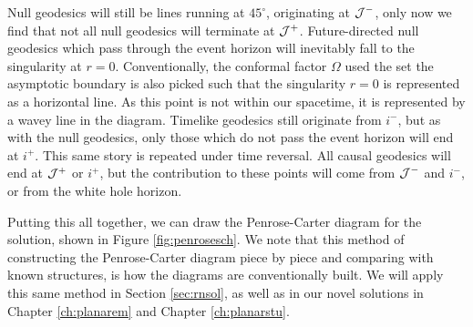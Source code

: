 Null geodesics will still be lines running at $45^\circ$, originating at ${\cal J}^-$, only now we find that not all null geodesics will terminate at ${\cal J}^+$. Future-directed null geodesics which pass through the event horizon will inevitably fall to the singularity at $r = 0$. Conventionally, the conformal factor $\Omega$ used the set the asymptotic boundary is also picked such that the singularity $r = 0$ is represented as a horizontal line. As this point is not within our spacetime, it is represented by a wavey line in the diagram. Timelike geodesics still originate from $i^-$, but as with the null geodesics, only those which do not pass the event horizon will end at $i^+$. This same story is repeated under time reversal. All causal geodesics will end at ${\cal J}^+$ or $i^+$, but the contribution to these points will come from ${\cal J}^-$ and $i^-$, or from the white hole horizon.

Putting this all together, we can draw the Penrose-Carter diagram for the \sch solution, shown in Figure \ref{fig:penrosesch}. We note that this method of constructing the Penrose-Carter diagram piece by piece and comparing with known structures, is how the diagrams are conventionally built. We will apply this same method in Section \ref{sec:rnsol}, as well as in our novel solutions in Chapter \ref{ch:planarem} and Chapter \ref{ch:planarstu}.

